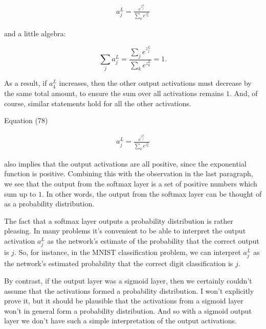\begin{align*}
a^L_j = \frac{e^{z^L_j}}{\sum_k e^{z^L_k}} \nonumber
\end{align*}

\noindent and a little algebra:

\begin{equation}
\sum_j a^L_j = \frac{\sum_j e^{z^L_j}}{\sum_k e^{z^L_k}} = 1.
\tag{79}
\end{equation}

\noindent As a result, if $a^L_4$ increases, then the other output activations must decrease by the same total amount, to ensure the sum over all activations remains $1$. And, of course, similar statements hold for all the other activations.


Equation (78)

\begin{align*}
a^L_j = \frac{e^{z^L_j}}{\sum_k e^{z^L_k}} \nonumber
\end{align*}

\noindent also implies that the output activations are all positive, since the exponential function is positive. Combining this with the observation in the last paragraph, we see that the output from the softmax layer is a set of positive numbers which sum up to $1$. In other words, the output from the softmax layer can be thought of as a probability distribution.


The fact that a softmax layer outputs a probability distribution is rather pleasing. In many problems it's convenient to be able to interpret the output activation $a^L_j$ as the network's estimate of the probability that the correct output is $j$. So, for instance, in the MNIST classification problem, we can interpret $a^L_j$ as the network's estimated probability that the correct digit classification is $j$.


By contrast, if the output layer was a sigmoid layer, then we certainly couldn't assume that the activations formed a probability distribution. I won't explicitly prove it, but it should be plausible that the activations from a sigmoid layer won't in general form a probability distribution. And so with a sigmoid output layer we don't have such a simple interpretation of the output activations.



